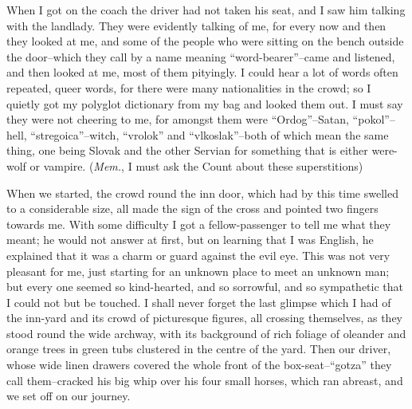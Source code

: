 \documentclass[12pt,openright]{book}
\begin{document}
When I got on the coach the driver had not taken his seat, and I saw him talking with the landlady. They were evidently talking of me, for every now and then they looked at me, and some of the people who were sitting on the bench outside the door–which they call by a name meaning “word-bearer”–came and listened, and then looked at me, most of them pityingly. I could hear a lot of words often repeated, queer words, for there were many nationalities in the crowd; so I quietly got my polyglot dictionary from my bag and looked them out. I must say they were not cheering to me, for amongst them were “Ordog”–Satan, “pokol”–hell, “stregoica”–witch, “vrolok” and “vlkoslak”–both of which mean the same thing, one being Slovak and the other Servian for something that is either were-wolf or vampire. (\textit{Mem.}, I must ask the Count about these superstitions)

When we started, the crowd round the inn door, which had by this time swelled to a considerable size, all made the sign of the cross and pointed two fingers towards me. With some difficulty I got a fellow-passenger to tell me what they meant; he would not answer at first, but on learning that I was English, he explained that it was a charm or guard against the evil eye. This was not very pleasant for me, just starting for an unknown place to meet an unknown man; but every one seemed so kind-hearted, and so sorrowful, and so sympathetic that I could not but be touched. I shall never forget the last glimpse which I had of the inn-yard and its crowd of picturesque figures, all crossing themselves, as they stood round the wide archway, with its background of rich foliage of oleander and orange trees in green tubs clustered in the centre of the yard. Then our driver, whose wide linen drawers covered the whole front of the box-seat–“gotza” they call them–cracked his big whip over his four small horses, which ran abreast, and we set off on our journey.
\end{document}
